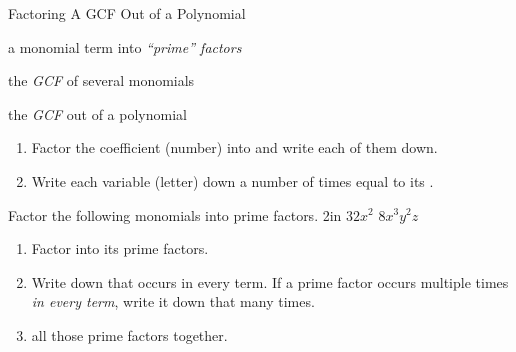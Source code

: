 \documentclass[letterpaper,12pt]{memoir}
\begin{document}

\pagestyle{myPagestyle}

\checkandfixthelayout
{}
\begin{myNotesHeader}{Factoring A GCF Out of a Polynomial}
    \item {} a monomial term into \emph{``prime'' factors}
    \item {} the \emph{GCF} of several monomials
    \item {} the \emph{GCF} out of a polynomial
\end{myNotesHeader}
  
\begin{myKeyConcepts}
    \begin{enumerate}
        \item Factor the coefficient (number) into 
        and write each of them down.
        \item Write each variable (letter) down a number of times equal to its 
        .
    \end{enumerate}
\end{myKeyConcepts}


\begin{myProblems2}%
    {Factor the following monomials into prime factors.}%
    {2in}%
    {\( 32x^2 \)}
    {\( 8 x^3y^2z \)}
\end{myProblems2}
  
\begin{myKeyConcepts}
    \begin{enumerate}
        \item Factor  into its prime factors.
        \item Write down  that occurs in every term. 
        If a prime factor occurs multiple times \emph{in every term}, 
        write it down that many times.
        \item {} all those prime factors together.
    \end{enumerate}
\end{myKeyConcepts}
\end{document}
